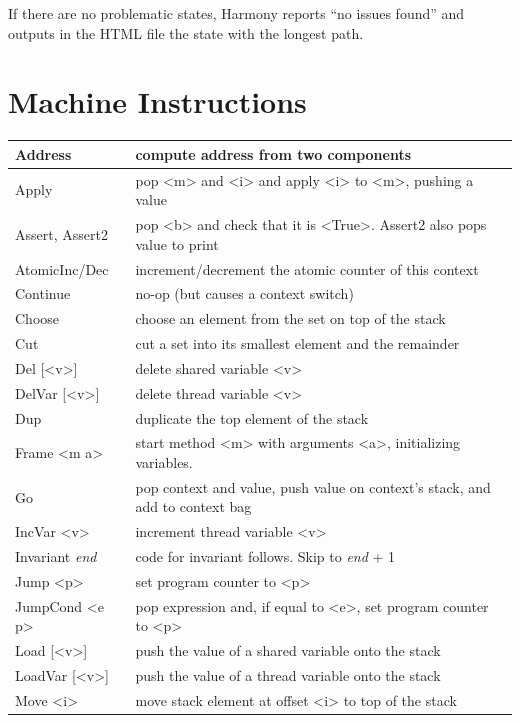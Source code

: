 \documentclass{report}
\begin{document}
If there are no problematic states, Harmony reports ``no issues found'' and outputs
in the HTML file the state with the longest path.

\section{Machine Instructions}
\label{ap:harmonybytecode}

{\small
\begin{tabular}{|l|l|}
\hline
Address & compute address from two components \\
\hline
Apply & pop <{m}> and <{i}> and apply <{i}> to <{m}>, pushing a value \\
\hline
Assert, Assert2 & pop <{b}> and check that it is <{True}>.  Assert2 also pops value to print \\
\hline
AtomicInc/Dec & increment/decrement the atomic counter of this context \\
\hline
Continue & no-op (but causes a context switch) \\
\hline
Choose & choose an element from the set on top of the stack \\
\hline
Cut & cut a set into its smallest element and the remainder \\
\hline
Del [<{v}>] & delete shared variable <{v}> \\
\hline
DelVar [<{v}>] & delete thread variable <{v}> \\
\hline
Dup & duplicate the top element of the stack \\
\hline
Frame <{m a}> & start method <{m}> with arguments <{a}>,
initializing variables.  \\
\hline
Go & pop context and value, push value on context's stack, and add to context bag \\
\hline
IncVar <{v}> & increment thread variable <{v}> \\
\hline
Invariant \textit{end} & code for invariant follows.  Skip to \textit{end} + 1\\
\hline
Jump <{p}> & set program counter to <{p}> \\
\hline
JumpCond <{e p}> & pop expression and, if equal to <{e}>, set program counter to <{p}> \\
\hline
Load [<{v}>] & push the value of a shared variable onto the stack \\
\hline
LoadVar [<{v}>] & push the value of a thread variable onto the stack \\
\hline
Move <{i}> & move stack element at offset <{i}> to top of the stack \\

\end{tabular}}
\end{document}

